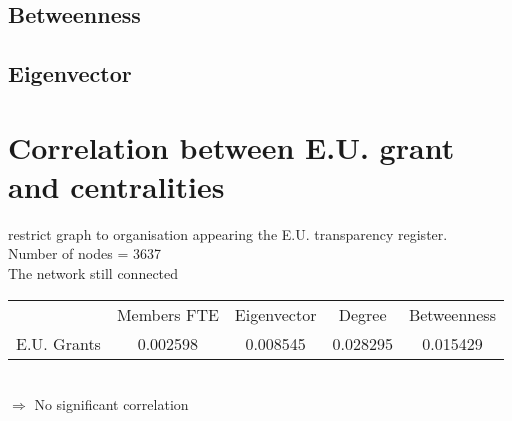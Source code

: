 \documentclass[ 11pt]{article}
\begin{document}
\subsection{Betweenness}

\subsection{Eigenvector}

\section{Correlation between E.U. grant and centralities}
restrict graph to organisation appearing the E.U. transparency register. \\
Number of nodes = 3637 \\
The network still connected \\
\begin{tabular}{|ccccc|}
\hline
             &Members FTE  &Eigenvector   & Degree  &Betweenness\\
E.U. Grants  &0.002598    &0.008545  &0.028295     &0.015429\\
\hline
\end{tabular}  \\
$\Rightarrow$ No significant correlation
\end{document}
